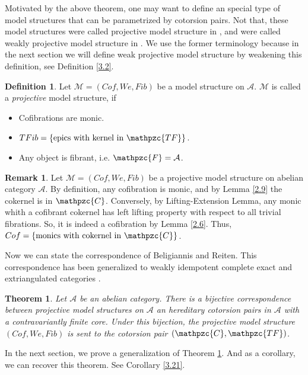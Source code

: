\documentclass[12pt]{amsart}
\numberwithin{equation}{section}
\newtheorem{theorem}[lemma]{Theorem}
\theoremstyle{definition}
\newtheorem{remark}[lemma]{Remark}
\newtheorem{definition}[lemma]{Definition}
\newtheorem*{theorem 0*}{Theorem}
\newtheorem*{theorem a*}{Theorem A}
\newtheorem*{theorem b*}{Theorem B}
\numberwithin{diagram}{section}
\begin{document}
Motivated by the above theorem, one may want to define an special type of model structures that can be parametrized by cotorsion pairs.
Not that, these model structures were called projective model structure in \cite{BR}, and were called weakly projective model structure in \cite{CLZ}. We use the former terminology because in the next section we will define weak projective model structure by weakening this definition, see Definition \ref{3.2}.
	
	\begin{definition}\label{2.14}
	Let $\mathcal{M}=(Cof,We,Fib)$ be a model structure on $\mathcal{A}$.
	$\mathcal{M}$ is called a {\it projective} model structure, if
	     \begin{itemize}
	     \item[(1)]
	     Cofibrations are monic.
	     \item[(2)]
	     $TFib=\{\text{epics with kernel in }\mathpzc{TF}\}$.
	     \item[(3)]
	     Any object is fibrant, i.e. $\mathpzc{F}=\mathcal{A}$.
	     \end{itemize}
	\end{definition}

\begin{remark}\label{2.15}
Let $\mathcal{M}=(Cof,We,Fib)$ be a projective model structure on abelian category $\mathcal{A}$. By definition, any cofibration is monic, and by Lemma \ref{2.9} the cokernel is in $\mathpzc{C}$.
Conversely, by Lifting-Extension Lemma, any monic whith a cofibrant cokernel has left lifting property with respect to all trivial fibrations. So, it is indeed a cofibration by Lemma \ref{2.6}. Thus, $Cof=\{\text{monics with cokernel in }\mathpzc{C}\}$.
\end{remark}

Now we can state the correspondence of Beligiannis and Reiten.
This correspondence has been generalized to weakly idempotent complete exact and extriangulated categories \cite{CLZ,HZZZ}.

\begin{theorem}\label{2.16}
Let $\mathcal{A}$ be an abelian category.
There is a bijective correspondence between projective model structures on $\mathcal{A}$ an hereditary cotorsion pairs in $\mathcal{A}$ with a contravariantly finite core.
Under this bijection, the projective model structure $(Cof,We,Fib)$ is sent to the cotorsion pair $(\mathpzc{C},\mathpzc{TF})$.
\end{theorem}

In the next section, we prove a generalization of Theorem \ref{2.16}. And as a corollary, we can recover this theorem. See Corollary \ref{3.21}.
\end{document}
